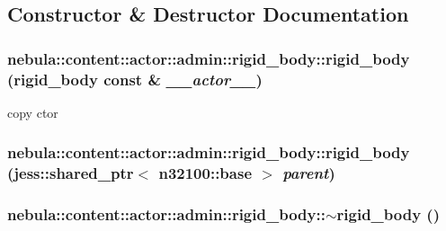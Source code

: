 \subsection{Constructor \& Destructor Documentation}
\hypertarget{classnebula_1_1content_1_1actor_1_1admin_1_1rigid__body_afca06591212ce2a515272f65d4572586}{
\subsubsection[{rigid\_\-body}]{\setlength{\rightskip}{0pt plus 5cm}nebula::content::actor::admin::rigid\_\-body::rigid\_\-body ({\bf rigid\_\-body} const \& {\em \_\-\_\-actor\_\-\_\-})}}
\label{classnebula_1_1content_1_1actor_1_1admin_1_1rigid__body_afca06591212ce2a515272f65d4572586}


copy ctor \hypertarget{classnebula_1_1content_1_1actor_1_1admin_1_1rigid__body_ab6e6cfc09165df01672f18bff95af841}{
\subsubsection[{rigid\_\-body}]{\setlength{\rightskip}{0pt plus 5cm}nebula::content::actor::admin::rigid\_\-body::rigid\_\-body (jess::shared\_\-ptr$<$ {\bf n32100::base} $>$ {\em parent})}}
\label{classnebula_1_1content_1_1actor_1_1admin_1_1rigid__body_ab6e6cfc09165df01672f18bff95af841}
\hypertarget{classnebula_1_1content_1_1actor_1_1admin_1_1rigid__body_a77aa0eaf0c39bf149e49c5651806807d}{
\subsubsection[{$\sim$rigid\_\-body}]{\setlength{\rightskip}{0pt plus 5cm}nebula::content::actor::admin::rigid\_\-body::$\sim$rigid\_\-body ()}}
\label{classnebula_1_1content_1_1actor_1_1admin_1_1rigid__body_a77aa0eaf0c39bf149e49c5651806807d}


